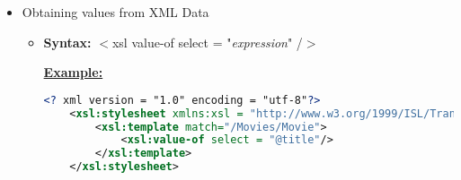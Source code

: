 \documentclass[12pt]{article}
\begin{document}
\begin{enumerate}[1.]
\begin{enumerate}[a)]
\begin{itemize}
            \item Obtaining values from XML Data
            \begin{itemize}
                \item \textbf{Syntax:} $<$xsl value-of select = "\textit{expression}" /$>$


                \bigskip

                \underline{\textbf{Example:}}

    \begin{lstlisting}[language=XML]
    <? xml version = "1.0" encoding = "utf-8"?>
    <xsl:stylesheet xmlns:xsl = "http://www.w3.org/1999/ISL/Transform">
        <xsl:template match="/Movies/Movie">
            <xsl:value-of select = "@title"/>
        </xsl:template>
    </xsl:stylesheet>
    \end{lstlisting}

            \end{itemize}
        \end{itemize}
    \end{enumerate}
\end{enumerate}
\end{document}
